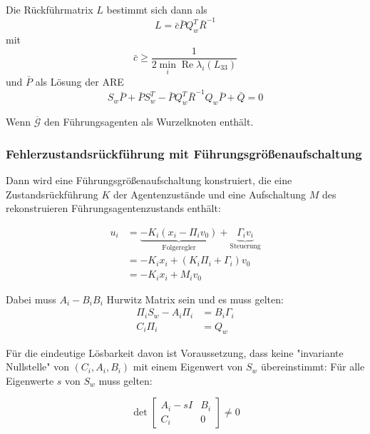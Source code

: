 Die Rückführmatrix $L$ bestimmt sich dann als
\begin{equation}
    L= \bar{c} \bar{P} Q_w^T \bar{R}^{-1}
\end{equation}
mit
\begin{equation}
    \bar{c} \geq \frac{1}{2 \min_{i}\operatorname{Re} \lambda_i(L_{33})}
\end{equation}
und $\bar{P}$ als Lösung der ARE
\begin{equation}
    S_w \bar{P} + \bar{P} S_w^T - \bar{P} Q_w^T \bar{R}^{-1} Q_w \bar{P} + \bar{Q} = 0
\end{equation}

Wenn $\overbar{\mathcal{G}}$ den Führungsagenten als Wurzelknoten enthält.

\subsubsection{Fehlerzustandsrückführung mit Führungsgrößenaufschaltung}
\label{sec:heterogen_regler}

Dann wird eine Führungsgrößenaufschaltung konstruiert, die eine Zustandsrückführung $K$
der Agentenzustände und eine Aufschaltung $M$ des rekonstruieren
Führungsagentenzustands enthält:

\begin{align}
    u_i &= \underbrace{-K_i (x_i - \Pi_i v_0)}_\text{Folgeregler}
    + \underbrace{\Gamma_i v_i}_\text{Steuerung} \\
    &= -K_i x_i + (K_i \Pi_i + \Gamma_i) v_0 \\
    &= -K_i x_i + M_i v_0
\end{align}

Dabei muss $A_i - B_i B_i$ Hurwitz Matrix sein und es muss gelten:
\begin{align}
    \Pi_i S_w - A_i \Pi_i &= B_i \Gamma_i \\
    C_i \Pi_i &= Q_w
\end{align}

Für die eindeutige Lösbarkeit davon ist Voraussetzung, dass keine "invariante Nullstelle"
von $(C_i, A_i, B_i)$ mit einem Eigenwert von $S_w$ übereinstimmt:
Für alle Eigenwerte $s$ von $S_w$ muss gelten:

\begin{equation}
    \det \begin{bmatrix}
        A_i -sI & B_i \\
        C_i & 0
    \end{bmatrix}
    \neq 0
\end{equation}
